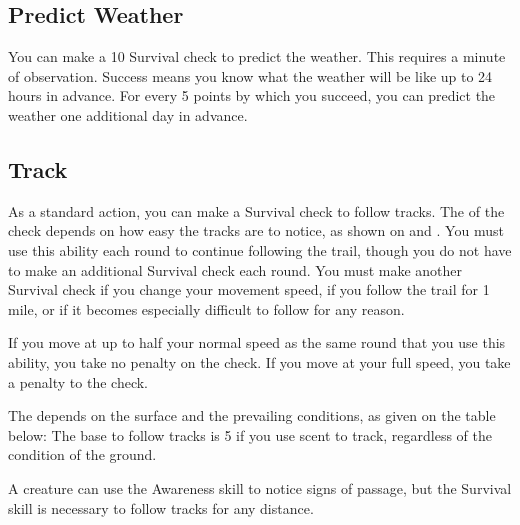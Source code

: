     \subsection{Predict Weather}
        You can make a  10 Survival check to predict the weather. This requires a minute of observation. Success means you know what the weather will be like up to 24 hours in advance. For every 5 points by which you succeed, you can predict the weather one additional day in advance.

    \subsection{Track}\label{Track}
        As a standard action, you can make a Survival check to follow tracks.
        The  of the check depends on how easy the tracks are to notice, as shown on  and .
        You must use this ability each round to continue following the trail, though you do not have to make an additional Survival check each round.
        You must make another Survival check if you change your movement speed, if you follow the trail for 1 mile, or if it becomes especially difficult to follow for any reason.

        If you move at up to half your normal speed as the same round that you use this ability, you take no penalty on the check.
        If you move at your full speed, you take a  penalty to the check.

        The  depends on the surface and the prevailing conditions, as given on the table below:
        The base  to follow tracks is 5 if you use scent to track, regardless of the condition of the ground.

        A creature can use the Awareness skill to notice signs of passage, but the Survival skill is necessary to follow tracks for any distance.

